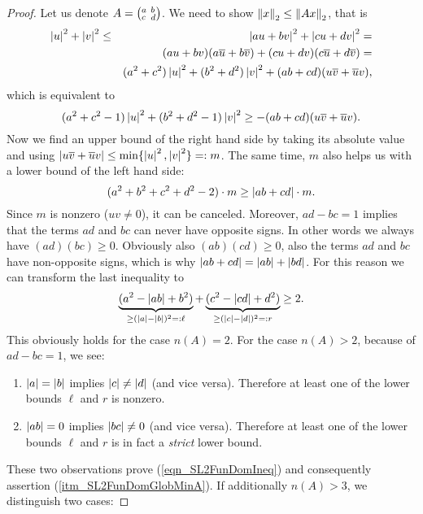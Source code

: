 \begin{proof}
Let us denote $A = \smallmat{a}{b}{c}{d}$. We need to show $\eucnorm{x} \le \eucnorm{Ax}$, that is
\begin{eqnarray*}
\abs{u}^2 + \abs{v}^2 
&\le& \abs{au + bv}^2 + \abs{cu + dv}^2 =\\
&& (au + bv)(a\conj{u} + b\conj{v}) + (cu + dv)(c\conj{u} + d\conj{v}) =\\
&& (a^2 + c^2)\abs{u}^2 + (b^2 + d^2)\abs{v}^2 + (ab + cd)(u\conj{v} + \conj{u}v),
\end{eqnarray*}
which is equivalent to
\begin{equation*}
(a^2 + c^2 - 1)\abs{u}^2 + (b^2 + d^2 - 1)\abs{v}^2 \ge -(ab + cd)(u\conj{v} + \conj{u}v).
\end{equation*}
Now we find an upper bound of the right hand side by taking its absolute value and using $\abs{u\conj{v} + \conj{u}v} \le \min\{\abs{u}^2, \abs{v}^2\} =: m$. The same time, $m$ also helps us with a lower bound of the left hand side:
\begin{equation*}
(a^2 + b^2 + c^2 + d^2 - 2) \cdot m \ge \abs{ab + cd} \cdot m.
\end{equation*}
Since $m$ is nonzero ($uv \ne 0$), it can be canceled. Moreover, $ad - bc = 1$ implies that the terms $ad$ and $bc$ can never have opposite signs. In other words we always have $(ad)(bc) \ge 0$. Obviously also $(ab)(cd) \ge 0$, \ie also the terms $ad$ and $bc$ have non-opposite signs, which is why $\abs{ab + cd} = \abs{ab} + \abs{bd}$. For this reason we can transform the last inequality to
\begin{equation}
\label{eqn_SL2FunDomIneq}
\underbrace{(a^2 - \abs{ab} + b^2)}_{\ge(\abs{a}-\abs{b})^2 =: \ell} + 
\underbrace{(c^2 - \abs{cd} + d^2)}_{\ge(\abs{c}-\abs{d})^2 =: r} \ge 2.
\end{equation}
This obviously holds for the case $n(A) = 2$. For the case $n(A) > 2$, because of $ad - bc = 1$, we see:
\begin{enumerate}[\quad(a)]
\item 
\label{itm_SL2FunDomObsA}
$\abs{a} = \abs{b}$ implies $\abs{c} \ne \abs{d}$ (and vice versa). Therefore at least one of the lower bounds $\ell$ and $r$ is nonzero.
\item 
\label{itm_SL2FunDomObsB}
$\abs{ab} = 0$ implies $\abs{bc} \ne 0$ (and vice versa). Therefore at least one of the lower bounds $\ell$ and $r$ is in fact a \emph{strict} lower bound.
\end{enumerate}
These two observations prove (\ref{eqn_SL2FunDomIneq}) and consequently assertion (\ref{itm_SL2FunDomGlobMinA}). If additionally $n(A) > 3$, we distinguish two cases:

\end{proof}
